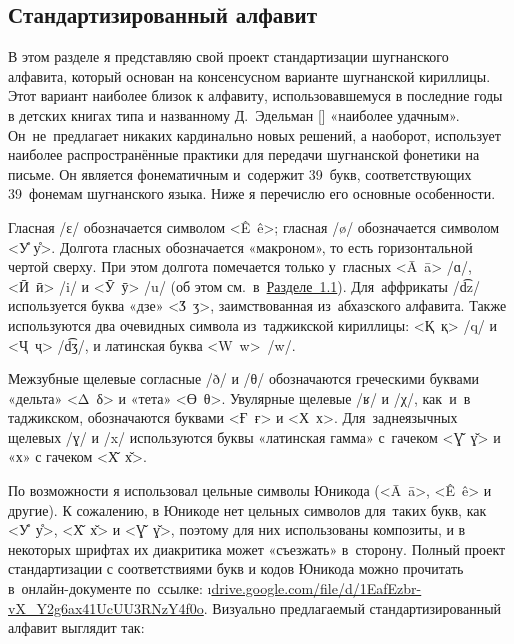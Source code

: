 \subsection{Стандартизированный алфавит} \label{ortho-project}

В этом разделе я представляю свой проект стандартизации шугнанского алфавита, который основан на консенсусном варианте шугнанской кириллицы. Этот вариант наиболее близок к алфавиту, использовавшемуся в последние годы в детских книгах типа \parencite{rizvonshoeva2015} и названному Д.~Эдельман [\cite*[104]{edelman2016}] «наиболее удачным». Он~не~предлагает никаких кардинально новых решений, а наоборот, использует наиболее распространённые практики для передачи шугнанской фонетики на письме. Он является фонематичным и~содержит 39~букв, соответствующих 39~фонемам шугнанского языка. Ниже я перечислю его основные особенности.

Гласная /ɛ/ обозначается символом <Ê~ê>; гласная /ø/ обозначается символом <У̊ у̊>. Долгота гласных обозначается «макроном», то есть горизонтальной чертой сверху. При этом долгота помечается только у~гласных <Ā~ā> /ɑ/, <Ӣ~ӣ> /i/ и <Ӯ~ӯ> /u/ (об этом см.~в~\hyperref[ortho-choice]{Разделе~1.1}). Для~аффрикаты /d͡z/ используется буква «дзе» <Ӡ~ӡ>, заимствованная из~абхазского алфавита. Также используются два очевидных символа из~таджикской кириллицы: <Қ~қ> /q/ и <Ҷ~ҷ> /d͡ʒ/, и латинская буква <W~w>~/w/.

\pagebreak[2]

Межзубные щелевые согласные /ð/ и /θ/ обозначаются греческими буквами «дельта» <Δ~δ> и «тета» <ϴ~θ>. Увулярные щелевые /ʁ/ и /χ/, как~и~в таджикском, обозначаются буквами <Ғ~ғ> и <Х~х>. Для~заднеязычных щелевых /ɣ/ и /x/ используются буквы «латинская гамма» с~гачеком <Ɣ̌~ɣ̌> и «х» с гачеком <Х̌~х̌>.

По возможности я использовал цельные символы Юникода (<Ā~ā>, <Ê~ê> и другие). К сожалению, в Юникоде нет цельных символов для~таких букв, как <У̊~у̊>, <Х̌~х̌> и <Ɣ̌~ɣ̌>, поэтому для них использованы композиты, и в некоторых шрифтах их диакритика может «съезжать» в~сторону. Полный проект стандартизации с соответствиями букв и кодов Юникода можно прочитать в~онлайн-документе \parencite{melenchenko2023_unicode} по~ссылке: \i{\href{https://drive.google.com/file/d/1EafEzbr-vX_Y2g6ax41UcUU3RNzY4f0o}{drive.google.com/file/d/1EafEzbr-vX\_Y2g6ax41UcUU3RNzY4f0o}}. Визуально предлагаемый стандартизированный алфавит выглядит так:

